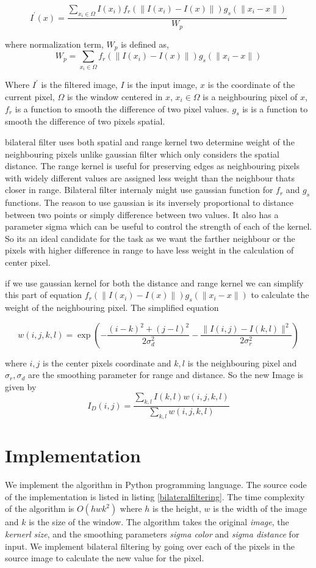 \documentclass[a4paper, english]{article}
\begin{document}
$$
I^\text{'}(x) = \frac{\sum_{x_i \in \Omega} I(x_i)f_r(\|I(x_i) - I(x)\|)g_s(\|x_i - x\|)}{W_p}
$$

where normalization term, $W_p$ is defined as,
$$
W_p = \sum_{x_i \in \Omega}{f_r(\|I(x_i) - I(x)\|)g_s(\|x_i - x\|)}
$$

Where $I^{'}$ is the filtered image,
$I$ is the input image,
$x$ is the coordinate of the current pixel,
$\Omega$ is the window centered in $x$,
$x_i \in \Omega$ is a neighbouring pixel of $x$,
$f_r$ is a function to smooth the difference of two pixel values.
$g_s$ is is a function to smooth the difference of two pixels spatial.


bilateral filter uses both spatial and range kernel two determine weight of the neighbouring pixels unlike gaussian filter\cite{wiki:gaussianfilter} which only considers the spatial distance. The range kernel is useful for preserving edges as neighbouring pixels with widely different values are assigned less weight than the neighbour thats closer in range. Bilateral filter internaly might use gaussian function for $f_r$ and $g_s$ functions. The reason to use gaussian is its inversely proportional to distance between two points or simply difference between two values. It also has a parameter sigma which can be useful to control the strength of each of the kernel. So its an ideal candidate for the task as we want the farther neighbour or the pixels with higher difference in range to have less weight in the calculation of center pixel.


if we use gaussian kernel for both the distance and range kernel we can simplify this part of equation
$
f_r(\|I(x_i) - I(x)\|)g_s(\|x_i - x\|)
$
to calculate the weight of the neighbouring pixel. The simplified equation 

$$
w(i, j, k, l) = \exp\left(-\frac{(i - k)^2 + (j - l)^2}{2 \sigma_d^2} - \frac{\|I(i, j) - I(k, l)\|^2}{2 \sigma_r^2}\right)
$$

where $i,j$ is the center pixels coordinate and $k,l$ is the neighbouring pixel and $\sigma_r, \sigma_d$ are the smoothing parameter for range and distance. So the new Image is given by
$$
I_D(i, j) = \frac{\sum_{k, l} I(k, l) w(i, j, k, l)}{\sum_{k, l} w(i, j, k, l)}
$$


\section{Implementation}
%
We implement the algorithm in Python programming language. The source code of the implementation is listed in listing \ref{bilateralfiltering}. The time complexity of the algorithm is $O(hwk^2)$ where $h$ is the height, $w$ is the width of the image and $k$ is the size of the window. The algorithm takes the original \textit{image}, the \textit{kernerl size}, and the smoothing parameters \textit{sigma color} and \textit{sigma distance} for input. We implement bilateral filtering by going over each of the pixels in the source image to calculate the new value for the pixel.
\end{document}
